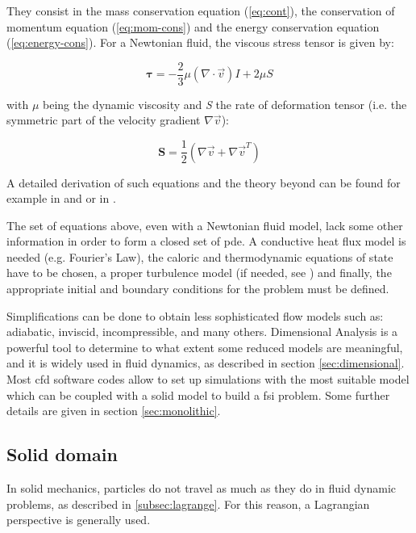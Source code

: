 They consist in the mass conservation equation (\ref{eq:cont}), the conservation of momentum equation (\ref{eq:mom-cons}) and the energy conservation equation (\ref{eq:energy-cons}). For a Newtonian fluid, the viscous stress tensor is given by:

\begin{equation}
	\label{eq:tau}
	\bm{\tau} = -\frac{2}{3}\mu \left( \nabla \cdot \vec{v} \right) I +2\mu S
\end{equation}

with $\mu$ being the dynamic viscosity and \textit{S} the rate of deformation tensor (i.e. the symmetric part of the velocity gradient $\nabla \vec{v}$):

\begin{equation}
	\label{eq:def_tens}
	\mathbf{S} = \frac{1}{2} \left( \nabla \vec{v} + \nabla \vec{v}^T \right)
\end{equation}

A detailed derivation of such equations and the theory beyond can be found for example in  \cite{quartapelle2013fluidodinamicaI} and \cite{quartapelle2013fluidodinamicaC} or in \cite{pope2001turbulent}. 

The set of equations above, even with a Newtonian fluid model, lack some other information in order to form a closed set of \acrfull{pde}. A conductive heat flux model is needed  (e.g. Fourier’s Law), the caloric and thermodynamic equations of state have to be chosen, a proper turbulence model (if needed, see \cite{pope2001turbulent}) and finally, the appropriate initial and boundary conditions for the problem \cite{galdi2011introduction} must be defined.

Simplifications can be done to obtain less sophisticated flow models such as: adiabatic, inviscid, incompressible, and many others. Dimensional Analysis is a powerful tool to determine to what extent some reduced models are meaningful, and it is widely used in fluid dynamics, as described in section \ref{sec:dimensional}. Most \acrshort{cfd} software codes allow to set up simulations with the most suitable model which can be coupled with a solid model to build a \acrshort{fsi} problem. Some further details are given in section \ref{sec:monolithic}. 


\subsection{Solid domain}
\label{sec:solid}

In solid mechanics, particles do not travel as much as they do in fluid dynamic problems, as described in \ref{subsec:lagrange}. For this reason, a Lagrangian perspective is generally used.  

